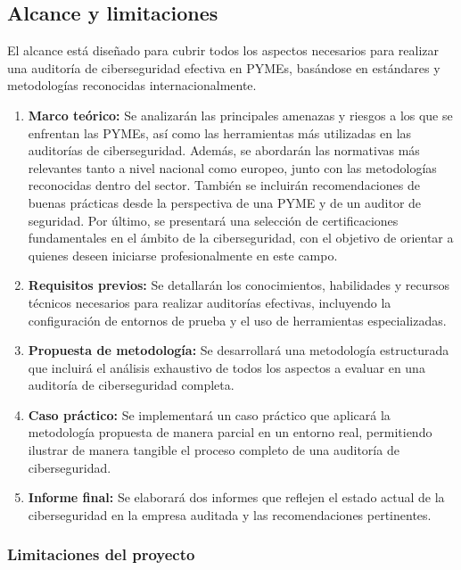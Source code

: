 \documentclass[a4paper, 11pt]{article}
\begin{document}
\subsection{Alcance y limitaciones}


El alcance está diseñado para cubrir todos los aspectos necesarios para realizar una auditoría de ciberseguridad efectiva en PYMEs, basándose en estándares y metodologías reconocidas internacionalmente.

\begin{enumerate}
    \item \textbf{Marco teórico:} Se analizarán las principales amenazas y riesgos a los que se enfrentan las PYMEs, así como las herramientas más utilizadas en las auditorías de ciberseguridad. Además, se abordarán las normativas más relevantes tanto a nivel nacional como europeo, junto con las metodologías reconocidas dentro del sector. También se incluirán recomendaciones de buenas prácticas desde la perspectiva de una PYME y de un auditor de seguridad. Por último, se presentará una selección de certificaciones fundamentales en el ámbito de la ciberseguridad, con el objetivo de orientar a quienes deseen iniciarse profesionalmente en este campo.    
    
    \item \textbf{Requisitos previos:} Se detallarán los conocimientos, habilidades y recursos técnicos necesarios para realizar auditorías efectivas, incluyendo la configuración de entornos de prueba y el uso de herramientas especializadas.
        
    \item \textbf{Propuesta de metodología:} Se desarrollará una metodología estructurada que incluirá el análisis exhaustivo de todos los aspectos a evaluar en una auditoría de ciberseguridad completa.
    \item \textbf{Caso práctico:} Se implementará un caso práctico que aplicará la metodología propuesta de manera parcial en un entorno real, permitiendo ilustrar de manera tangible el proceso completo de una auditoría de ciberseguridad.
    
    \item \textbf{Informe final:} Se elaborará dos informes que reflejen el estado actual de la ciberseguridad en la empresa auditada y las recomendaciones pertinentes.
\end{enumerate}

\subsubsection*{Limitaciones del proyecto}
\end{document}
